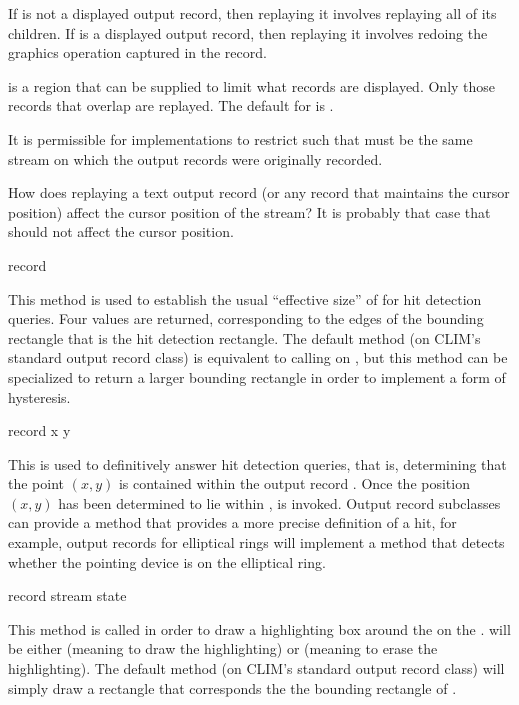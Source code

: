 If  is not a displayed output record, then replaying it involves
replaying all of its children.  If  is a displayed output record,
then replaying it involves redoing the graphics operation captured in the
record.

 is a region that can be supplied to limit what records are
displayed.  Only those records that overlap  are replayed.  The
default for  is .

It is permissible for implementations to restrict  such
that  must be the same stream on which the output records were
originally recorded.

 {How does replaying a text output record (or any record that
maintains the cursor position) affect the cursor position of the stream?  It
is probably that case that  should not affect the cursor position.}


 {record}

This method is used to establish the usual ``effective size'' of 
for hit detection queries.  Four values are returned, corresponding to the edges
of the bounding rectangle that is the hit detection rectangle.  The default
method (on CLIM's standard output record class) is equivalent to calling
 on , but this method can be specialized to
return a larger bounding rectangle in order to implement a form of hysteresis.

 {record x y}

This is used to definitively answer hit detection queries, that is, determining
that the point $(x,y)$ is contained within the output record .  Once
the position $(x,y)$ has been determined to lie within
,
 is invoked.  Output record
subclasses can provide a method that provides a more precise definition of a
hit, for example, output records for elliptical rings will implement a method
that detects whether the pointing device is on the elliptical ring.

 {record stream state}

This method is called in order to draw a highlighting box around the
  on the 
.   will be either  (meaning to draw the
highlighting) or  (meaning to erase the highlighting).  The
default method (on CLIM's standard output record class) will simply draw a
rectangle that corresponds the the bounding rectangle of .

